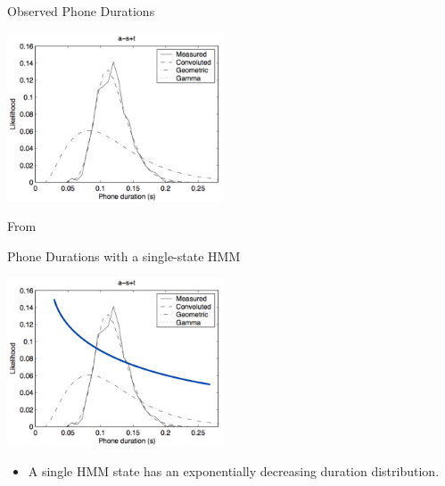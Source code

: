 \begin{frame}{Observed Phone Durations}
  \begin{center}
    \includegraphics[height=50mm]{figures/durations}
  \end{center}
  \tiny From \cite{Pylkkonen04durationmodeling}
\end{frame}

\begin{frame}{Phone Durations with a single-state HMM}
  \begin{center}
    \includegraphics[height=50mm]{figures/durations3}
  \end{center}
  \begin{itemize}
  \item A single HMM state has an exponentially decreasing duration distribution.
  \end{itemize}
\end{frame}

